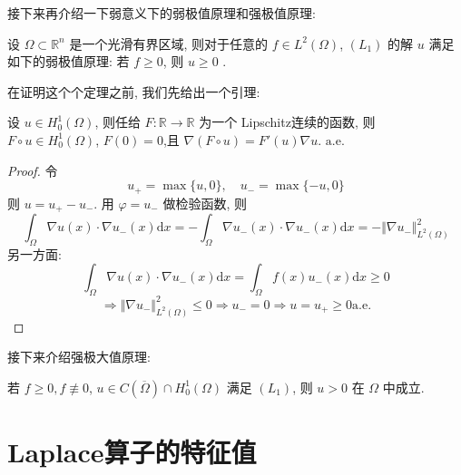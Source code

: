 \documentclass[11pt]{ctexart}[UTF8]
\begin{document}
接下来再介绍一下弱意义下的弱极值原理和强极值原理:\par
设 $\Omega \subset \mathbb{R}^n$ 是一个光滑有界区域, 则对于任意的 $f \in L^2(\Omega)$, $(L_1)$ 的解 $u$ 满足如下的弱极值原理:
若 $f \geq 0$, 则 $u \geq 0$ .\par
在证明这个个定理之前, 我们先给出一个引理:
\begin{lemma}
    设 $u \in H_{0}^{1}(\Omega)$, 则任给 $F: \mathbb{R} \to \mathbb{R}$ 为一个 Lipschitz连续的函数, 则 $F \circ u \in H_{0}^{1}(\Omega)$, $F(0) = 0$,且 $\nabla (F \circ u) = F'(u)\nabla u$. $\mathrm{a.e.}$
\end{lemma}
\begin{proof}
    令
    \begin{equation*}
        u_{+} = \max\{ u, 0 \},\quad u_{-} = \max\{ -u, 0 \}
    \end{equation*}
    则 $u = u_{+} - u_{-}$. 用 $\varphi = u_{-}$ 做检验函数, 则
    \begin{equation*}
        \int_{\Omega} \nabla u(x) \cdot \nabla u_{-}(x) \mathrm{d}x = -\int_{\Omega} \nabla u_{-}(x) \cdot \nabla u_{-}(x) \mathrm{d}x = -\Vert \nabla u_{-} \Vert_{L^2(\Omega)}^2
    \end{equation*}
    另一方面:
    \begin{equation*}
        \int_{\Omega} \nabla u(x) \cdot \nabla u_{-}(x) \mathrm{d}x = \int_{\Omega} f(x) u_{-}(x) \mathrm{d}x \geq 0
    \end{equation*}
    \begin{equation*}
        \Longrightarrow \Vert \nabla u_{-} \Vert_{L^2(\Omega)}^2 \leq 0 \Longrightarrow u_{-} = 0 \Longrightarrow u = u_{+} \geq 0 \mathrm{a.e.}
    \end{equation*}
\end{proof}
接下来介绍强极大值原理:\par
若 $f \geq 0, f \not\equiv 0$, $u \in C(\overline{\Omega})\cap H_0^1(\Omega)$ 满足 $(L_1)$, 则 $u > 0$ 在 $\Omega$ 中成立.
\newpage


\section{Laplace算子的特征值}
\end{document}
